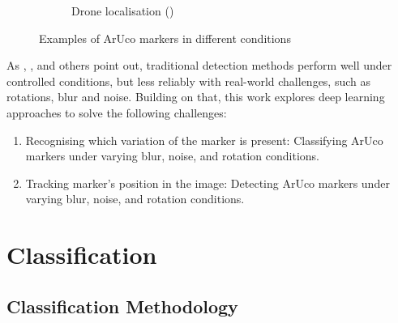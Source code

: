 \documentclass[conference]{IEEEtran}
\begin{document}
\begin{figure}[h]
\begin{subfigure}[b]{0.45\textwidth}
        \caption{Drone localisation (\cite{Nakajima2024AboutAE})}
        \label{fig:aruco2}
    \end{subfigure}
    \caption{Examples of ArUco markers in different conditions}
    \label{fig:aruco_markers}
\end{figure}

As \textcite{FiducialMarkerNoisy}, \textcite{ROMERORAMIREZ2021104094}, and others point out, traditional detection methods perform well under controlled 
conditions, but less reliably with real-world challenges, such as rotations, blur and noise. Building on that, this work explores deep learning 
approaches to solve the following challenges:

\begin{enumerate}
  \item Recognising which variation of the marker is present: Classifying ArUco markers under varying blur, noise, and rotation conditions. 
  \item Tracking marker's position in the image: Detecting ArUco markers under varying blur, noise, and rotation conditions. 
\end{enumerate}

\section{Classification}

\subsection{Classification Methodology}
\end{document}
